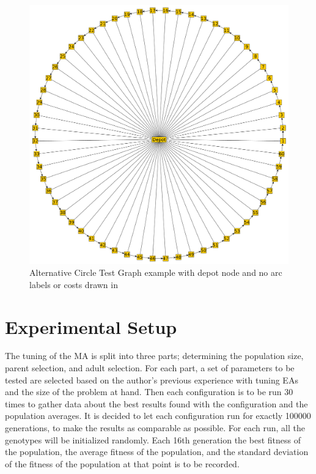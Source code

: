 \begin{figure}[thbp]
    \centerline{\includegraphics[width=\textwidth]{figures/CircleTests/CircleTestIllustrations/Circle_Test_Graph_Central_Depot-No_arc_or_edge_labels_or_costs.pdf}}
    \caption{Alternative Circle Test Graph example with depot node and no arc labels or costs drawn in}
    \label{fig:ctgcdnaoeloc}
\end{figure}



\clearpage

\section{Experimental Setup} %
\label{sec:experimental_setup}
The tuning of the MA is split into three parts; determining the population size, parent selection, and adult selection. For each part, a set of parameters to be tested are selected based on the author's previous experience with tuning EAs and the size of the problem at hand. Then each configuration is to be run 30 times to gather data about the best results found with the configuration and the population averages. It is decided to let each configuration run for exactly 100000 generations, to make the results as comparable as possible. For each run, all the genotypes will be initialized randomly. Each 16th generation the best fitness of the population, the average fitness of the population, and the standard deviation of the fitness of the population at that point is to be recorded.

